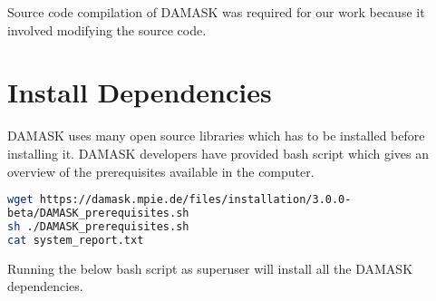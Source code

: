 Source code compilation of DAMASK was required for our work because it involved modifying the source code.
\section{Install Dependencies}
DAMASK uses many open source libraries which has to be installed before installing it. DAMASK developers have provided bash script which gives an overview of the prerequisites available in the computer.

\begin{lstlisting}[language=bash, basicstyle=\small\ttfamily, frame=single]
wget https://damask.mpie.de/files/installation/3.0.0-
beta/DAMASK_prerequisites.sh
sh ./DAMASK_prerequisites.sh
cat system_report.txt
\end{lstlisting}

Running the below bash script as superuser will install all the DAMASK dependencies.

